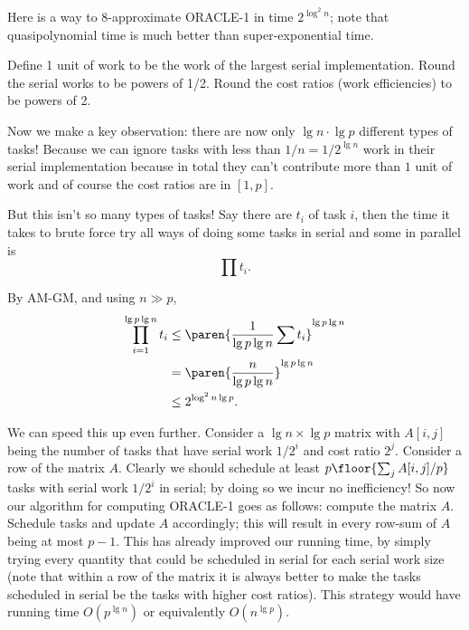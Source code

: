 {\color{red}
Here is a way to 8-approximate ORACLE-1 in time $2^{\log^2 n}$;
note that quasipolynomial time is much better than super-exponential time.

Define 1 unit of work to be the work of the largest serial
implementation.
Round the serial works to be powers of 1/2.
Round the cost ratios (work efficiencies) to be powers of 2. 

Now we make a key observation: there are now only 
$\lg n \cdot \lg p$ different types of tasks!
Because we can ignore tasks with less than $1/n = 1/2^{\lg n}$ work
in their serial implementation because in total they can't
contribute more than $1$ unit of work 
and of course the cost ratios are in $[1,p]$.

But this isn't so many types of tasks! Say there are $t_i$ of
task $i$, then the time it takes to brute force try all ways of
doing some tasks in serial and some in parallel is 
$$\prod t_i.$$

By AM-GM, and using $n \gg p$,
\begin{align*}
\prod_{i=1}^{\lg p \lg n} t_i &\le \paren{\frac{1}{\lg p \lg n} \sum t_i}^{\lg p \lg n} \\
&= \paren{\frac{n}{\lg p \lg n}}^{\lg p \lg n}\\
&\le 2^{\log^2 n \lg p}.
\end{align*}

We can speed this up even further.
Consider a $\lg n \times \lg p$ matrix with $A[i,j]$ being the number of tasks that
have serial work $1/2^i$ and cost ratio $2^j$.
Consider a row of the matrix $A$. Clearly we should schedule at
least $p \floor{\sum_j A[i, j]/p}$ tasks with serial work $1/2^i$ in
serial; by doing so we incur no inefficiency! 
So now our algorithm for computing ORACLE-1 goes as follows:
compute the matrix $A$. Schedule tasks and update $A$
accordingly; this will result in every row-sum of $A$ being at
most $p-1$.
This has already improved our running time, by simply trying
every quantity that could be scheduled in serial for each serial
work size (note that within a row of the matrix it is always
better to make the tasks scheduled in serial be the tasks with
higher cost ratios). This strategy would have running time
$O(p^{\lg n})$ or equivalently $O(n^{\lg p})$.

}

